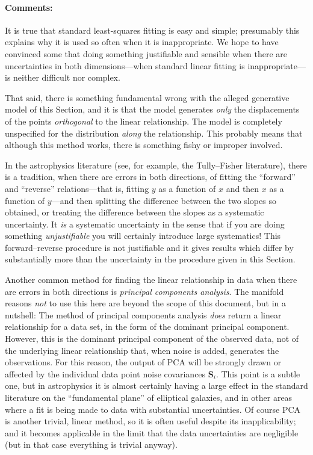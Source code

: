 \documentclass[12pt,twoside]{article}
\newcommand{\documentname}{document}
\newcommand{\sectionname}{Section}
\newcommand{\commentsname}{Comments}
\newenvironment{comments}{\paragraph{\commentsname:}}{}
\newcommand{\mmatrix}[1]{\boldsymbol{#1}}
\newcommand{\mS}{\mmatrix{S}}
\begin{document}
\begin{comments}
It is true that standard least-squares fitting is easy and simple;
presumably this explains why it is used so often when it is
inappropriate.  We hope to have convinced some that doing something
justifiable and sensible when there are uncertainties in both
dimensions---when standard linear fitting is inappropriate---is
neither difficult nor complex.

That said, there is something fundamental wrong with the alleged
generative model of this \sectionname, and it is that the model
generates \emph{only} the displacements of the points
\emph{orthogonal} to the linear relationship.  The model is completely
unspecified for the distribution \emph{along} the relationship.  This
probably means that although this method works, there is something
fishy or improper involved.

In the astrophysics literature (see, for example, the Tully--Fisher
literature), there is a tradition, when there are errors in both
directions, of fitting the ``forward'' and ``reverse''
relations---that is, fitting $y$ as a function of $x$ and then $x$ as
a function of $y$---and then splitting the difference between the two
slopes so obtained, or treating the difference between the slopes as a
systematic uncertainty.  It \emph{is} a systematic uncertainty in the
sense that if you are doing something \emph{unjustifiable} you will
certainly introduce large systematics!  This forward--reverse
procedure is not justifiable and it gives results which differ by
substantially more than the uncertainty in the procedure given in this
\sectionname.

Another common method for finding the linear relationship in data when
there are errors in both directions is \emph{principal components
  analysis}.  The manifold reasons \emph{not} to use this here are
beyond the scope of this \documentname, but in a nutshell: The method of
principal components analysis \emph{does} return a linear relationship
for a data set, in the form of the dominant principal component.
However, this is the dominant principal component of the observed
data, not of the underlying linear relationship that, when noise is
added, generates the observations.  For this reason, the output of PCA
will be strongly drawn or affected by the individual data point noise
covariances $\mS_i$.  This point is a subtle one, but in astrophysics
it is almost certainly having a large effect in the standard
literature on the ``fundamental plane'' of elliptical galaxies, and in
other areas where a fit is being made to data with substantial
uncertainties.  Of course PCA is another trivial, linear method, so it
is often useful despite its inapplicability; and it becomes applicable
in the limit that the data uncertainties are negligible (but in that
case everything is trivial anyway).
\end{comments}
\end{document}
